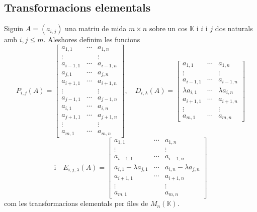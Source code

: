 \documentclass[../Apunts.tex]{subfiles}
\begin{document}
	\subsection{Transformacions elementals}
	\begin{definition} %
		\label{def:transformacions elementals}
		Siguin \(A=(a_{i,j})\) una matriu de mida \(m\times n\) sobre un cos \(\mathbb{K}\) i \(i\) i \(j\) dos naturals amb \(i,j\leq m\). Aleshores definim les funcions
		\[P_{i,j}(A)=\left[\begin{matrix}
		a_{1,1} & \cdots & a_{1,n} \\
		\vdots & & \vdots \\
		a_{i-1,1} & \cdots & a_{i-1,n} \\
		a_{j,1} & \cdots & a_{j,n} \\
		a_{i+1,1} & \cdots & a_{i+1,n} \\
		\vdots & & \vdots \\
		a_{j-1,1} & \cdots & a_{j-1,n} \\
		a_{i,1} & \cdots & a_{i,n} \\
		a_{j+1,1} & \cdots & a_{j+1,n} \\
		\vdots & & \vdots \\
		a_{m,1} & \cdots & a_{m,n}
		\end{matrix}\right],\quad D_{i,\lambda}(A)=\left[\begin{matrix}
		a_{1,1} & \cdots & a_{1,n} \\
		\vdots & & \vdots \\
		a_{i-1,1} & \cdots & a_{i-1,n} \\
		\lambda a_{i,1} & \cdots & \lambda a_{i,n} \\
		a_{i+1,1} & \cdots & a_{i+1,n} \\
		\vdots & & \vdots \\
		a_{m,1} & \cdots & a_{m,n}
		\end{matrix}\right]\]
		\[\text{i}\quad E_{i,j,\lambda}(A)=\left[\begin{matrix}
		a_{1,1} & \cdots & a_{1,n} \\
		\vdots & & \vdots \\
		a_{i-1,1} & \cdots & a_{i-1,n} \\
		a_{i,1}-\lambda a_{j,1} & \cdots & a_{i,n}-\lambda a_{j,n}\\
		a_{i+1,1} & \cdots & a_{i+1,n} \\
		\vdots & & \vdots \\
		a_{m,1} & & a_{m,n}
		\end{matrix}\right]\]
		com les transformacions elementals per files de \(M_{n}(\mathbb{K})\).
	\end{definition}
\end{document}
